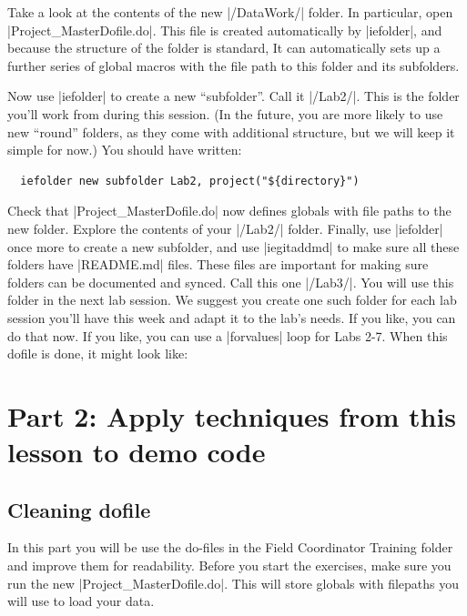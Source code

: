\documentclass{tufte-handout}
\begin{document}
Take a look at the contents of the new |/DataWork/| folder.
In particular, open |Project_MasterDofile.do|.
This file is created automatically by |iefolder|,
and because the structure of the folder is standard,
It can automatically sets up a further series of global macros
with the file path to this folder and its subfolders.

Now use |iefolder| to create a new ``subfolder''.
Call it |/Lab2/|. This is the folder you’ll work from during this session.
(In the future, you are more likely to use new ``round'' folders,
as they come with additional structure,
but we will keep it simple for now.)
You should have written:
\begin{Verbatim}
  iefolder new subfolder Lab2, project("${directory}")
\end{Verbatim}
Check that |Project_MasterDofile.do| now defines globals
with file paths to the new folder.
Explore the contents of your |/Lab2/| folder.
Finally, use |iefolder| once more to create a new subfolder,
and use |iegitaddmd|
to make sure all these folders have |README.md| files.
These files are important for making sure folders can be documented and synced.
Call this one |/Lab3/|. You will use this folder in the next lab session.
We suggest you create one such folder for each lab session you’ll have this week
and adapt it to the lab’s needs. If you like, you can do that now.
If you like, you can use a |forvalues| loop for Labs 2-7.
When this dofile is done, it might look like:

\begin{figure}
{
}
\end{figure}

\section{Part 2: Apply techniques from this lesson to demo code}

\subsection{Cleaning dofile}

In this part you will be use the do-files in the Field Coordinator Training folder
and improve them for readability.
Before you start the exercises, make sure you run the new |Project_MasterDofile.do|.
This will store globals with filepaths you will use to load your data.
\end{document}
